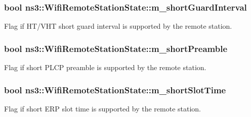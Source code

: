 \subsubsection[{\texorpdfstring{m\+\_\+short\+Guard\+Interval}{m_shortGuardInterval}}]{\setlength{\rightskip}{0pt plus 5cm}bool ns3\+::\+Wifi\+Remote\+Station\+State\+::m\+\_\+short\+Guard\+Interval}\hypertarget{structns3_1_1WifiRemoteStationState_af0c8e10d63d0b1b5737ae917b3e40b64}{}\label{structns3_1_1WifiRemoteStationState_af0c8e10d63d0b1b5737ae917b3e40b64}


Flag if H\+T/\+V\+HT short guard interval is supported by the remote station. 

\subsubsection[{\texorpdfstring{m\+\_\+short\+Preamble}{m_shortPreamble}}]{\setlength{\rightskip}{0pt plus 5cm}bool ns3\+::\+Wifi\+Remote\+Station\+State\+::m\+\_\+short\+Preamble}\hypertarget{structns3_1_1WifiRemoteStationState_ab4f0872263d7462ad90dd5821f0d0c13}{}\label{structns3_1_1WifiRemoteStationState_ab4f0872263d7462ad90dd5821f0d0c13}


Flag if short P\+L\+CP preamble is supported by the remote station. 

\subsubsection[{\texorpdfstring{m\+\_\+short\+Slot\+Time}{m_shortSlotTime}}]{\setlength{\rightskip}{0pt plus 5cm}bool ns3\+::\+Wifi\+Remote\+Station\+State\+::m\+\_\+short\+Slot\+Time}\hypertarget{structns3_1_1WifiRemoteStationState_a1ca8cb2d693c1e38381b2a82e3081983}{}\label{structns3_1_1WifiRemoteStationState_a1ca8cb2d693c1e38381b2a82e3081983}


Flag if short E\+RP slot time is supported by the remote station. 

